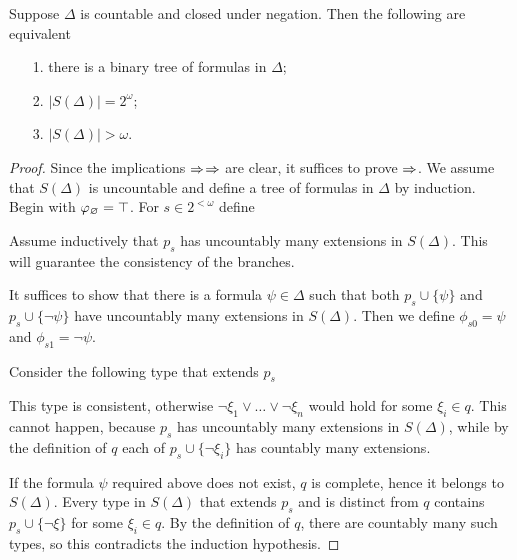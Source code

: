 \documentclass[creche.tex]{subfiles}
\begin{document}
\begin{lemma}\label{lem_bin_tree}
Suppose $\Delta$ is countable and closed under negation.
Then the following are equivalent\nobreak
\begin{itemize}   
\item[1.] there is a binary tree of formulas in $\Delta$;
\item[2.] $\big|S(\Delta)\big|=2^\omega$;
\item[3.] $\big|S(\Delta)\big|>\omega$.
\end{itemize}
\end{lemma}
\begin{proof}
Since the implications $\Rightarrow$$\Rightarrow$ are clear, it
suffices to prove $\Rightarrow$.
We assume that $S(\Delta)$ is uncountable and define a tree of
formulas in $\Delta$ by induction.
Begin with $\varphi_\varnothing=\top$.
For $s\in 2^{<\omega}$ define


Assume inductively that $p_s$ has uncountably many extensions in $S(\Delta)$.
This will guarantee the consistency of the branches.

It suffices to show that there is a formula $\psi\in\Delta$ such that
both $p_s\cup\{\psi\}$ and $p_s\cup\{\neg\psi\}$ have uncountably many
extensions in $S(\Delta)$.
Then we define $\phi_{s0}=\psi$ and $\phi_{s1}=\neg\psi$.

Consider the following type that extends $p_s$


This type is consistent, otherwise $\neg\xi_1\vee\dots\vee\neg\xi_n$
would hold for some $\xi_i \in q$.
This cannot happen, because $p_s$ has uncountably many extensions in
$S(\Delta)$, while by the definition of $q$ each of
$p_s\cup\{\neg\xi_i\}$ has countably many extensions.

If the formula $\psi$ required above does not exist, $q$ is complete,
hence it belongs to $S(\Delta)$.
Every type in $S(\Delta)$ that extends $p_s$ and is distinct from $q$
contains $p_s\cup\{\neg\xi\}$ for some $\xi_i\in q$.
By the definition of $q$, there are countably many such types,
so this contradicts the induction hypothesis.
\end{proof}
\end{document}
